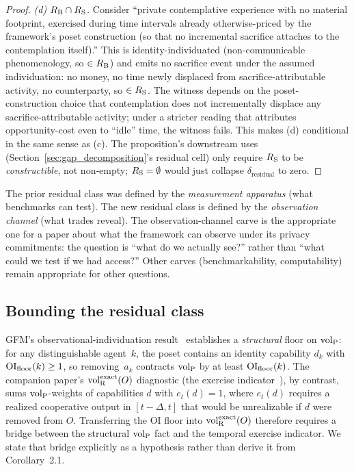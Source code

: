 \begin{proof}
\emph{(d) $R_{\mathrm{B}} \cap R_{\mathrm{S}}$.}
Consider ``private contemplative experience with no material
footprint, exercised during time intervals already
otherwise-priced by the framework's poset construction (so
that no incremental sacrifice attaches to the contemplation
itself).''  This is identity-individuated (non-communicable
phenomenology, so $\in R_{\mathrm{B}}$) and emits no sacrifice event
under the assumed individuation: no money, no time newly
displaced from sacrifice-attributable activity, no
counterparty, so $\in R_{\mathrm{S}}$.  The witness depends on the
poset-construction choice that contemplation does not
incrementally displace any sacrifice-attributable activity;
under a stricter reading that attributes opportunity-cost
even to ``idle'' time, the witness fails.  This makes (d)
conditional in the same sense as (c).  The proposition's
downstream uses (Section~\ref{sec:gap_decomposition}'s
residual cell) only require $R_{\mathrm{S}}$ to be
\emph{constructible}, not non-empty;
$R_{\mathrm{S}} = \emptyset$ would just collapse
$\delta_{\mathrm{residual}}$ to zero.
\end{proof}

\begin{remark}
The prior residual class was defined by the \emph{measurement
apparatus} (what benchmarks can test).  The new residual class
is defined by the \emph{observation channel} (what trades
reveal).  The observation-channel carve is the appropriate one
for a paper about what the framework can observe under its
privacy commitments: the question is ``what do we actually
see?'' rather than ``what could we test if we had access?''
Other carves (benchmarkability, computability) remain
appropriate for other questions.
\end{remark}

\subsection{Bounding the residual class}

GFM's observational-individuation
result~\citep[Corollary~2.1]{lasser2026horizon} establishes a
\emph{structural} floor on ${\operatorname{vol}_{\mathrm{P}}}$: for any distinguishable
agent~$k$, the poset contains an identity capability $d_k$ with
$\mathrm{OI}_{\mathrm{floor}}(k) \geq 1$, so removing~$a_k$ contracts ${\operatorname{vol}_{\mathrm{P}}}$ by at
least $\mathrm{OI}_{\mathrm{floor}}(k)$.  The companion paper's ${\operatorname{vol}_{\mathrm{R}}^{\mathrm{exact}}}(O)$
diagnostic
(the exercise indicator~\citep[Revealed~Sacrifice]{lasser2026paper8a}), by
contrast, sums ${\operatorname{vol}_{\mathrm{P}}}$-weights of capabilities $d$ with
$e_t(d) = 1$, where
$e_t(d)$ requires a realized cooperative output in
$[t-\Delta, t]$ that would be unrealizable if $d$ were removed
from $O$.  Transferring the OI floor into ${\operatorname{vol}_{\mathrm{R}}^{\mathrm{exact}}}(O)$
therefore requires a bridge between the structural ${\operatorname{vol}_{\mathrm{P}}}$ fact
and the temporal exercise indicator.  We state that bridge
explicitly as a hypothesis rather than derive it from
Corollary~2.1.


